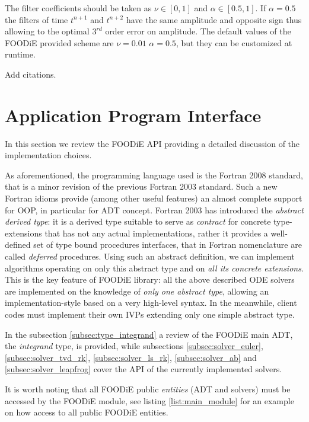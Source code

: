 \documentclass[pdftex,preprint,3p,times,numbers]{elsarticle}
\begin{document}
The filter coefficients should be taken as $\nu \in [0,1]$ and $\alpha \in [0.5,1]$. If $\alpha=0.5$ the filters of time $t^{n+1}$ and $t^{n+2}$ have the same amplitude and opposite sign thus allowing to the optimal $3^{rd}$ order error on amplitude. The default values of the FOODiE provided scheme are $\nu=0.01$ $\alpha=0.5$, but they can be customized at runtime.

{\color{red} Add citations.}

\clearpage

\section{Application Program Interface}\label{sec:API}

In this section we review the FOODiE API providing a detailed discussion of the implementation choices.

As aforementioned, the programming language used is the Fortran 2008 standard, that is a minor revision of the previous Fortran 2003 standard. Such a new Fortran idioms provide (among other useful features) an almost complete support for OOP, in particular for ADT concept. Fortran 2003 has introduced the \emph{abstract derived type}: it is a derived type suitable to serve as \emph{contract} for concrete type-extensions that has not any actual implementations, rather it provides a well-defined set of type bound procedures interfaces, that in Fortran nomenclature are called \emph{deferred} procedures. Using such an abstract definition, we can implement algorithms operating on only this abstract type and on \emph{all its concrete extensions}. This is the key feature of FOODiE library: all the above described ODE solvers are implemented on the knowledge of \emph{only one abstract type}, allowing an implementation-style based on a very high-level syntax. In the meanwhile, client codes must implement their own IVPs extending only one simple abstract type.

In the subsection \ref{subsec:type_integrand} a review of the FOODiE main ADT, the \emph{integrand} type, is provided, while subsections \ref{subsec:solver_euler}, \ref{subsec:solver_tvd_rk}, \ref{subsec:solver_ls_rk}, \ref{subsec:solver_ab} and \ref{subsec:solver_leapfrog} cover the API of the currently implemented solvers.

It is worth noting that all FOODiE public \emph{entities} (ADT and solvers) must be accessed by the FOODiE module, see listing \ref{list:main_module} for an example on how access to all public FOODiE entities.
\end{document}
